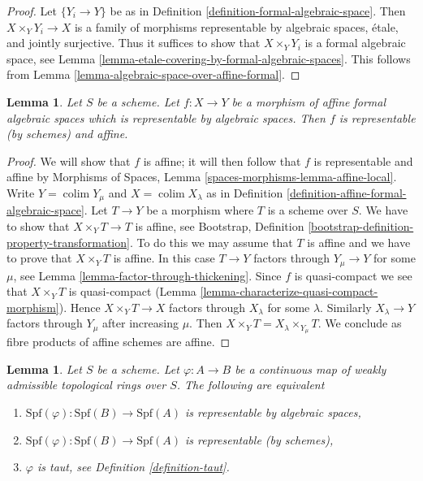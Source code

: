 \documentclass{stacks-project}
\theoremstyle{plain}
\newtheorem{lemma}[subsection]{Lemma}
\theoremstyle{definition}
\theoremstyle{remark}
\numberwithin{equation}{subsection}
\def\colim{\mathop{\mathrm{colim}}\nolimits}
\begin{document}
\begin{proof}
Let $\{Y_i \to Y\}$ be as in
Definition \ref{definition-formal-algebraic-space}.
Then $X \times_Y Y_i \to X$ is a family of morphisms
representable by algebraic spaces, \'etale, and jointly
surjective. Thus it suffices to show that
$X \times_Y Y_i$ is a formal algebraic space, see
Lemma \ref{lemma-etale-covering-by-formal-algebraic-spaces}.
This follows from Lemma \ref{lemma-algebraic-space-over-affine-formal}.
\end{proof}

\begin{lemma}
\label{lemma-affine-representable-by-algebraic-spaces}
Let $S$ be a scheme. Let $f : X \to Y$ be a morphism of
affine formal algebraic spaces which is representable by
algebraic spaces. Then $f$ is representable (by schemes) and affine.
\end{lemma}

\begin{proof}
We will show that $f$ is affine; it will then follow that
$f$ is representable and affine by
Morphisms of Spaces, Lemma \ref{spaces-morphisms-lemma-affine-local}.
Write $Y = \colim Y_\mu$ and $X = \colim X_\lambda$ as in
Definition \ref{definition-affine-formal-algebraic-space}.
Let $T \to Y$ be a morphism where $T$ is a scheme
over $S$. We have to show that $X \times_Y T \to T$ is affine, see
Bootstrap, Definition
\ref{bootstrap-definition-property-transformation}.
To do this we may assume that $T$ is affine and we have to prove
that $X \times_Y T$ is affine. In this case $T \to Y$ factors
through $Y_\mu \to Y$ for some $\mu$, see
Lemma \ref{lemma-factor-through-thickening}.
Since $f$ is quasi-compact we see that $X \times_Y T$ is
quasi-compact (Lemma \ref{lemma-characterize-quasi-compact-morphism}).
Hence $X \times_Y T \to X$ factors through $X_\lambda$ for some
$\lambda$. Similarly $X_\lambda \to Y$ factors through $Y_\mu$
after increasing $\mu$. Then
$X \times_Y T = X_\lambda \times_{Y_\mu} T$.
We conclude as fibre products of affine schemes are affine.
\end{proof}

\begin{lemma}
\label{lemma-representable-affine}
Let $S$ be a scheme. Let $\varphi : A \to B$ be a continuous map of
weakly admissible topological rings over $S$. The following
are equivalent
\begin{enumerate}
\item $\text{Spf}(\varphi) : \text{Spf}(B) \to \text{Spf}(A)$
is representable by algebraic spaces,
\item $\text{Spf}(\varphi) : \text{Spf}(B) \to \text{Spf}(A)$
is representable (by schemes),
\item $\varphi$ is taut, see Definition \ref{definition-taut}.
\end{enumerate}
\end{lemma}
\end{document}
